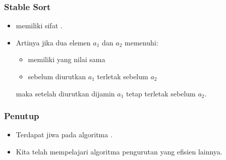 \begin{frame}
\frametitle{Stable Sort}
\begin{itemize}
  \item \fQuickSort memiliki sifat  .
  \item Artinya jika dua elemen $a_1$ dan $a_2$ memenuhi:
  \begin{itemize}
    \item memiliki yang nilai sama
    \item sebelum diurutkan $a_1$ terletak sebelum $a_2$
  \end{itemize}
  maka setelah diurutkan  dijamin $a_1$ tetap terletak sebelum $a_2$.
\end{itemize}
\end{frame}

\begin{frame}
\frametitle{Penutup}
\begin{itemize}
  \item Terdapat jiwa \fdivideAndConquer pada algoritma \fquickSort.
  \item Kita telah mempelajari algoritma pengurutan yang efisien lainnya.
\end{itemize}
\end{frame}



